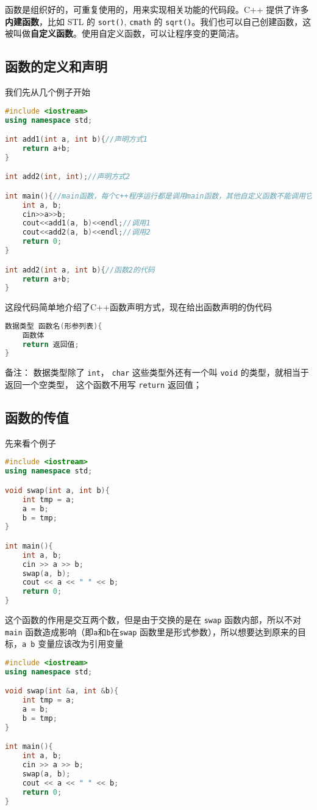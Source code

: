 
\begin{issues}
\issueDraft
\end{issues}

函数是组织好的，可重复使用的，用来实现相关功能的代码段。C++ 提供了许多\textbf{内建函数}，比如 STL 的 \verb|sort()|, \verb|cmath| 的 \verb|sqrt()|。我们也可以自己创建函数，这被叫做\textbf{自定义函数}。使用自定义函数，可以让程序变的更简洁。

\subsection{函数的定义和声明}
我们先从几个例子开始
\begin{lstlisting}[language=cpp]
#include <iostream>
using namespace std;

int add1(int a, int b){//声明方式1
    return a+b;
}

int add2(int, int);//声明方式2

int main(){//main函数，每个c++程序运行都是调用main函数，其他自定义函数不能调用它
    int a, b;
    cin>>a>>b;
    cout<<add1(a, b)<<endl;//调用1
    cout<<add2(a, b)<<endl;//调用2
    return 0;
}

int add2(int a, int b){//函数2的代码
    return a+b;
}
\end{lstlisting}
这段代码简单地介绍了C++函数声明方式，现在给出函数声明的伪代码
\begin{lstlisting}[language=cpp]
数据类型 函数名(形参列表){
    函数体
    return 返回值;
}
\end{lstlisting}
备注： 数据类型除了 \verb|int|， \verb|char| 这些类型外还有一个叫 \verb|void| 的类型，就相当于返回一个空类型， 这个函数不用写 \verb|return| 返回值；

\subsection{函数的传值}
先来看个例子
\begin{lstlisting}[language=cpp]
#include <iostream>
using namespace std;

void swap(int a, int b){
    int tmp = a;
    a = b;
    b = tmp;
}

int main(){
    int a, b;
    cin >> a >> b;
    swap(a, b);
    cout << a << " " << b;
    return 0;
}
\end{lstlisting}
这个函数的作用是交互两个数，但是由于交换的是在 \verb|swap| 函数内部，所以不对 \verb|main| 函数造成影响（即\verb|a|和\verb|b|在\verb|swap| 函数里是形式参数），所以想要达到原来的目标，\verb|a b| 变量应该改为引用变量
\begin{lstlisting}[language=cpp]
#include <iostream>
using namespace std;

void swap(int &a, int &b){
    int tmp = a;
    a = b;
    b = tmp;
}

int main(){
    int a, b;
    cin >> a >> b;
    swap(a, b);
    cout << a << " " << b;
    return 0;
}
\end{lstlisting}